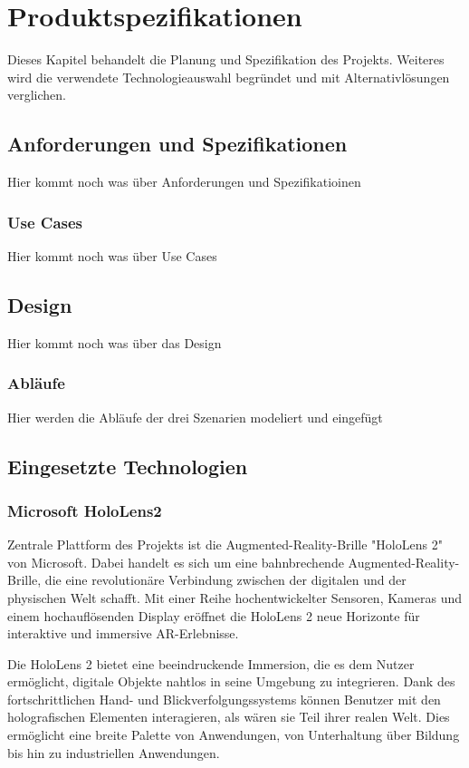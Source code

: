 \chapter{Produktspezifikationen}
Dieses Kapitel behandelt die Planung und Spezifikation des Projekts.
Weiteres wird die verwendete Technologieauswahl begründet und mit Alternativlösungen verglichen.

\section{Anforderungen und Spezifikationen}
Hier kommt noch was über Anforderungen und Spezifikatioinen

\subsection{Use Cases}
Hier kommt noch was über Use Cases

\section{Design}
Hier kommt noch was über das Design

\subsection{Abläufe}
Hier werden die Abläufe der drei Szenarien modeliert und eingefügt


\section{Eingesetzte Technologien}

\subsection{Microsoft HoloLens2}
Zentrale Plattform des Projekts ist die Augmented-Reality-Brille "HoloLens 2" von Microsoft. Dabei handelt es sich um
eine bahnbrechende Augmented-Reality-Brille, die eine revolutionäre Verbindung zwischen der digitalen und der physischen
Welt schafft. Mit einer Reihe hochentwickelter Sensoren, Kameras und einem hochauflösenden Display eröffnet die HoloLens
2 neue Horizonte für interaktive und immersive AR-Erlebnisse.

Die HoloLens 2 bietet eine beeindruckende Immersion, die es dem Nutzer ermöglicht, digitale Objekte nahtlos in seine
Umgebung zu integrieren. Dank des fortschrittlichen Hand- und Blickverfolgungssystems können Benutzer mit den holografischen
Elementen interagieren, als wären sie Teil ihrer realen Welt. Dies ermöglicht eine breite Palette von Anwendungen, von
Unterhaltung über Bildung bis hin zu industriellen Anwendungen.

